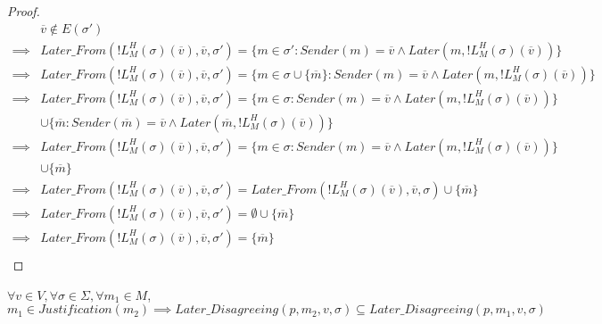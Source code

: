 \begin{proof}
\begin{align}
        &\overline{v} \notin E(\sigma') \\
\implies&Later\_From(!L^H_M(\sigma)(\overline{v}), \overline{v}, \sigma') = \{m \in \sigma' : Sender(m) = \overline{v} \land Later(m, !L^H_M(\sigma)(\overline{v}))\} \\
\implies&Later\_From(!L^H_M(\sigma)(\overline{v}), \overline{v}, \sigma') = \{m \in \sigma \cup \{\overline{m}\} : Sender(m) = \overline{v} \land Later(m, !L^H_M(\sigma)(\overline{v}))\} \\
\implies&Later\_From(!L^H_M(\sigma)(\overline{v}), \overline{v}, \sigma') = \{m \in \sigma : Sender(m) = \overline{v} \land Later(m, !L^H_M(\sigma)(\overline{v}))\} \\
        &\cup \{\overline{m} : Sender(\overline{m}) = \overline{v} \land Later(\overline{m}, !L^H_M(\sigma)(\overline{v}))\} \\
\implies&Later\_From(!L^H_M(\sigma)(\overline{v}), \overline{v}, \sigma') = \{m \in \sigma : Sender(m) = \overline{v} \land Later(m, !L^H_M(\sigma)(\overline{v}))\} \\
        &\cup \{\overline{m}\} \\
\implies&Later\_From(!L^H_M(\sigma)(\overline{v}), \overline{v}, \sigma') = Later\_From(!L^H_M(\sigma)(\overline{v}), \overline{v}, \sigma) \cup \{\overline{m}\} \\
\implies&Later\_From(!L^H_M(\sigma)(\overline{v}), \overline{v}, \sigma') = \emptyset \cup \{\overline{m}\} \\
\implies&Later\_From(!L^H_M(\sigma)(\overline{v}), \overline{v}, \sigma') = \{\overline{m}\} \\
\end{align}
\end{proof}

\begin{lemma}
$\forall v \in V, \forall \sigma \in \Sigma, \forall m_1 \in M$,
$$
  m_1 \in Justification(m_2) \implies Later\_Disagreeing(p,m_2,v,\sigma) \subseteq Later\_Disagreeing(p,m_1,v,\sigma)
$$
\end{lemma}

